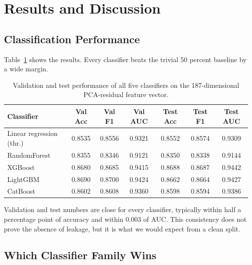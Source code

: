 \documentclass[runningheads]{llncs}
\begin{document}
\section{Results and Discussion}

\subsection{Classification Performance}

Table~\ref{tab:results} shows the results. Every classifier beats the trivial 50 percent baseline by a wide margin.

\begin{table}[t]
\centering
\caption{Validation and test performance of all five classifiers on the 187-dimensional PCA-residual feature vector.}
\label{tab:results}
\small
\begin{tabular}{@{}lcccccc@{}}
\toprule
Classifier & Val Acc & Val F1 & Val AUC & Test Acc & Test F1 & Test AUC \\
\midrule
Linear regression (thr.)  & 0.8535 & 0.8556 & 0.9321 & 0.8552 & 0.8574 & 0.9309 \\
RandomForest              & 0.8355 & 0.8346 & 0.9121 & 0.8350 & 0.8338 & 0.9144 \\
XGBoost                   & 0.8680 & 0.8685 & 0.9415 & 0.8688 & 0.8687 & 0.9442 \\
LightGBM                  & 0.8690 & 0.8700 & 0.9424 & 0.8662 & 0.8664 & 0.9427 \\
CatBoost                  & 0.8602 & 0.8608 & 0.9360 & 0.8598 & 0.8594 & 0.9386 \\
\bottomrule
\end{tabular}
\end{table}

Validation and test numbers are close for every classifier, typically within half a percentage point of accuracy and within 0.003 of AUC. This consistency does not prove the absence of leakage, but it is what we would expect from a clean split.



\subsection{Which Classifier Family Wins}
\end{document}
